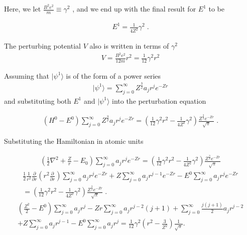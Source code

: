     \noindent Here, we let $\frac{B^2 e^2}{m} \equiv \gamma^2$ \cite{Killingbeck_1979}, and we end up with the final result for $E^1$ to be 

    \begin{align}
        E^1 = \frac{1}{4Z^2} \gamma^2\;.
    \end{align}

    \noindent The perturbing potential $V$ also is written in terms of $\gamma^2$
    \begin{align}
        V = \frac{B^2 e^2}{12m} r^2 = \frac{1}{12} \gamma^2 r^2
    \end{align}

    \noindent Assuming that $\vert \psi^1 \rangle$ is of the form of a power series 
    \begin{align}
        \vert \psi^1 \rangle = \sum_{j = 0}^\infty Z^{\frac{3}{2}} a_j r^j e^{-Zr}
    \end{align}
    \noindent and substituting both $E^1$ and $\vert \psi^1 \rangle$ into the perturbation equation

    \begin{align}
        \left(H^0 - E^0 \right) \sum_{j = 0}^\infty Z^{\frac{3}{2}} a_j r^j e^{-Zr} = \left( \frac{1}{12} \gamma^2 r^2 - \frac{1}{4Z^2} \gamma^2 \right) \frac{Z^{\frac{3}{2}} e^{-Zr}}{\sqrt{\pi}}\;.
    \end{align}

    \noindent Substituting the Hamiltonian in atomic units 

    \begin{align*}
        \left(\frac{1}{2}\nabla^2 + \frac{Z}{r} - E_0\right) \sum_{j = 0}^\infty a_j r^j e^{-Zr} = \left( \frac{1}{12} \gamma^2 r^2 - \frac{1}{4Z^2} \gamma^2 \right) \frac{Z^{\frac{3}{2}} e^{-Zr}}{\sqrt{\pi}}
    \end{align*}
    \begin{align*}
        \frac{1}{2} \frac{1}{r^2} \frac{\partial}{\partial r} \left(r^2 \frac{\partial}{\partial r} \right) \sum_{j = 0}^\infty a_j r^j e^{-Zr} + Z \sum_{j = 0}^\infty a_j r^{j - 1} e^{-Zr} - E^0 \sum_{j = 0}^\infty a_j r^j e^{-Zr} \nonumber\\ = \left( \frac{1}{12} \gamma^2 r^2 - \frac{1}{4Z^2} \gamma^2 \right) \frac{Z^{\frac{3}{2}} e^{-Zr}}{\sqrt{\pi}}\;.
    \end{align*}
    \begin{align*}
        \left( \frac{Z^2}{2} - E^0\right) \sum_{j = 0}^\infty a_j r^j - Zr \sum_{j = 0}^\infty a_j r^{j -2} (j + 1) + \sum_{j = 0}^\infty \frac{j(j+1)}{2} a_j r^{j - 2} \nonumber\\+ Z \sum_{j = 0}^\infty a_j r^{j -1} - E^0 \sum_{j = 0}^\infty a_j r^j = \frac{1}{12} \gamma^2 \left(r^2 - \frac{3}{Z^2} \right) \frac{1}{\sqrt{\pi}}.
    \end{align*}

